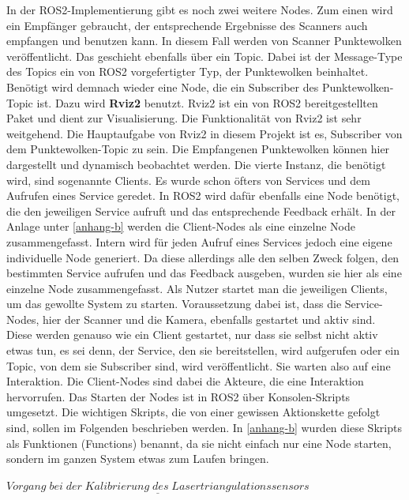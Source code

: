 		In der ROS2-Implementierung gibt es noch zwei weitere Nodes. Zum einen wird ein Empfänger gebraucht, der entsprechende Ergebnisse des Scanners auch empfangen und benutzen kann. In diesem Fall werden von Scanner Punktewolken veröffentlicht. Das geschieht ebenfalls über ein Topic. Dabei ist der Message-Type des Topics ein von ROS2 vorgefertigter Typ, der Punktewolken beinhaltet. Benötigt wird demnach wieder eine Node, die ein Subscriber des Punktewolken-Topic ist. Dazu wird \textbf{Rviz2} benutzt. Rviz2 ist ein von ROS2 bereitgestellten Paket und dient zur Visualisierung. Die Funktionalität von Rviz2 ist sehr weitgehend. Die Hauptaufgabe von Rviz2 in diesem Projekt ist es, Subscriber von dem Punktewolken-Topic zu sein. Die Empfangenen Punktewolken können hier dargestellt und dynamisch beobachtet werden. \newline
		Die vierte Instanz, die benötigt wird, sind sogenannte Clients. Es wurde schon öfters von Services und dem Aufrufen eines Service geredet. In ROS2 wird dafür ebenfalls eine Node benötigt, die den jeweiligen Service aufruft und das entsprechende Feedback erhält. In der Anlage unter \ref{anhang-b} werden die Client-Nodes als eine einzelne Node zusammengefasst. Intern wird für jeden Aufruf eines Services jedoch eine eigene individuelle Node generiert. Da diese allerdings alle den selben Zweck folgen, den bestimmten Service aufrufen und das Feedback ausgeben, wurden sie hier als eine einzelne Node zusammengefasst. Als Nutzer startet man die jeweiligen Clients, um das gewollte System zu starten. Voraussetzung dabei ist, dass die Service-Nodes, hier der Scanner und die Kamera, ebenfalls gestartet und aktiv sind. Diese werden genauso wie ein Client gestartet, nur dass sie selbst nicht aktiv etwas tun, es sei denn, der Service, den sie bereitstellen, wird aufgerufen oder ein Topic, von dem sie Subscriber sind, wird veröffentlicht. Sie warten also auf eine Interaktion. Die Client-Nodes sind dabei die Akteure, die eine Interaktion hervorrufen. Das Starten der Nodes ist in ROS2 über Konsolen-Skripts umgesetzt. Die wichtigen Skripts, die von einer gewissen Aktionskette gefolgt sind, sollen im Folgenden beschrieben werden. In \ref{anhang-b} wurden diese Skripts als Funktionen (Functions) benannt, da sie nicht einfach nur eine Node starten, sondern im ganzen System etwas zum Laufen bringen.
		
		$\underline{Vorgang\;bei\;der\;Kalibrierung\;des\;Lasertriangulationssensors}$
		
